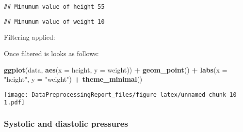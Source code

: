 \documentclass[
]{article}
\newenvironment{Shaded}{\begin{snugshade}}{\end{snugshade}}
\newcommand{\AttributeTok}[1]{\textcolor[rgb]{0.13,0.29,0.53}{#1}}
\newcommand{\DecValTok}[1]{\textcolor[rgb]{0.00,0.00,0.81}{#1}}
\newcommand{\FunctionTok}[1]{\textcolor[rgb]{0.13,0.29,0.53}{\textbf{#1}}}
\newcommand{\NormalTok}[1]{#1}
\newcommand{\OtherTok}[1]{\textcolor[rgb]{0.56,0.35,0.01}{#1}}
\newcommand{\SpecialCharTok}[1]{\textcolor[rgb]{0.81,0.36,0.00}{\textbf{#1}}}
\newcommand{\StringTok}[1]{\textcolor[rgb]{0.31,0.60,0.02}{#1}}
\begin{document}
\begin{verbatim}
## Minumum value of height 55
\end{verbatim}

\begin{Shaded}
\end{Shaded}

\begin{verbatim}
## Minumum value of weight 10
\end{verbatim}

Filtering applied:

\begin{Shaded}
\end{Shaded}

Once filtered is looks as follows:

\begin{Shaded}
\begin{Highlighting}[]
\FunctionTok{ggplot}\NormalTok{(data, }\FunctionTok{aes}\NormalTok{(}\AttributeTok{x =}\NormalTok{ height, }\AttributeTok{y =}\NormalTok{ weight)) }\SpecialCharTok{+}
  \FunctionTok{geom\_point}\NormalTok{() }\SpecialCharTok{+}
  \FunctionTok{labs}\NormalTok{(}\AttributeTok{x =} \StringTok{"height"}\NormalTok{, }\AttributeTok{y =} \StringTok{"weight"}\NormalTok{) }\SpecialCharTok{+}
  \FunctionTok{theme\_minimal}\NormalTok{()}
\end{Highlighting}
\end{Shaded}

\texttt{[image: DataPreprocessingReport\_files/figure-latex/unnamed-chunk-10-1.pdf]}

\hypertarget{systolic-and-diastolic-pressures}{%
\subsubsection{Systolic and diastolic
pressures}\label{systolic-and-diastolic-pressures}}
\end{document}
